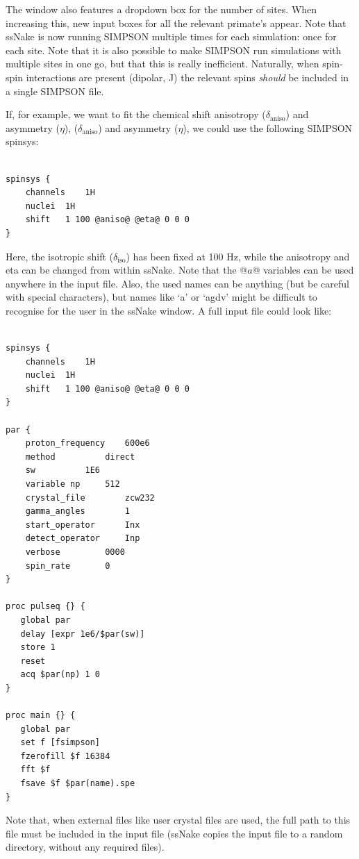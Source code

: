 \documentclass[11pt,a4paper]{article}
\begin{document}
The window also features a dropdown box for the number of sites. When increasing this, new input
boxes for all the relevant primate's appear. Note that ssNake is now running SIMPSON multiple times
for each simulation: once for each site. Note that it is also possible to make SIMPSON run
simulations with multiple sites in one go, but that this is really inefficient. Naturally, when
spin-spin interactions are present (dipolar, J) the relevant spins \textit{should} be included in a single
SIMPSON file.


If, for example, we want to fit the chemical shift anisotropy ($\delta_\text{aniso}$) and asymmetry ($\eta$), 
($\delta_\text{aniso}$) and asymmetry ($\eta$), we could use the following SIMPSON spinsys:

\lstset{language=tcl}          %

\begin{lstlisting}[frame=single]  % Start your code-block

spinsys {
    channels	1H
    nuclei	1H
    shift	1 100 @aniso@ @eta@ 0 0 0
}
\end{lstlisting}
Here, the isotropic shift ($\delta_\text{iso}$) has been fixed at 100 Hz, while the anisotropy and
eta can be changed from within ssNake. Note that the @$a$@ variables can be used anywhere in the
input file. Also, the used names can be anything (but be careful with special characters), but names
like `a' or `agdv' might be difficult to recognise for the user in the ssNake window.
A full input file could look like:

\begin{lstlisting}[frame=single]  % Start your code-block

spinsys {
    channels	1H
    nuclei	1H
    shift	1 100 @aniso@ @eta@ 0 0 0
}

par {
	proton_frequency	600e6
	method 			direct
	sw			1E6
	variable np		512
	crystal_file	  	zcw232
	gamma_angles		1
	start_operator		Inx
	detect_operator		Inp
	verbose			0000
	spin_rate 		0
}

proc pulseq {} {
   global par
   delay [expr 1e6/$par(sw)]
   store 1
   reset
   acq $par(np) 1 0
}

proc main {} {
   global par
   set f [fsimpson]
   fzerofill $f 16384
   fft $f
   fsave $f $par(name).spe
}
\end{lstlisting}
Note that, when external files like user crystal files are used, the full path to this file must be
included in the input file (ssNake copies the input file to a random directory, without any
required files).
\end{document}
